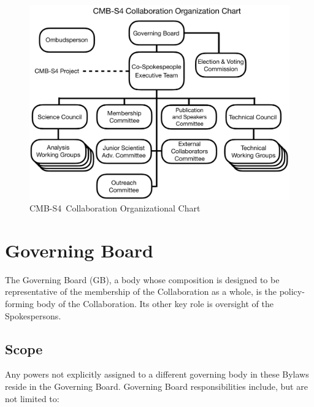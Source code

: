 \documentclass[12pt]{article}
\newcommand{\exec}{{Executive Team}}
\newcommand\collabname{CMB-S4}
\begin{document}
\begin{figure}[h!]
\begin{center}
\includegraphics[width=6.5in]{CMB-S4_Org_chart_+_details_v10.pdf}
\end{center}
\caption{\collabname\ Collaboration Organizational Chart}
\label{fig:org_chart}
\end{figure}

\section{Governing Board}

The Governing Board (GB), a body whose composition is designed to be representative of the membership of the Collaboration as a whole, is the %
policy-forming body of the Collaboration.  Its other key role is oversight of the Spokespersons.

\subsection{Scope}
Any powers not explicitly assigned to a different governing body in these Bylaws reside in the Governing Board.
Governing Board responsibilities include, but are not limited to:  %
\end{document}
